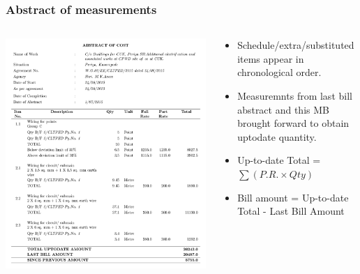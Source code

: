 \documentclass{beamer}
\begin{document}
\begin{frame}
  \frametitle{Abstract of measurements}
  \begin{columns}
    \begin{column}{.5\textwidth}
        \begin{block}{}
        \centering
        \includegraphics[width=1\linewidth]{figures/abstract.pdf}
      \end{block}
    \end{column}
    \begin{column}{.5\textwidth}
    \pause
      \begin{itemize}[<+->]
        \item Schedule/extra/substituted items appear in chronological order.
        \item Measuremnts from last bill abstract and this MB brought forward to obtain uptodate quantity.
        \item Up-to-date Total = $\sum(P.R. \times Qty)$
        \item Bill amount = Up-to-date Total - Last Bill Amount
      \end{itemize}
    \end{column}
  \end{columns}
\end{frame}
\end{document}

